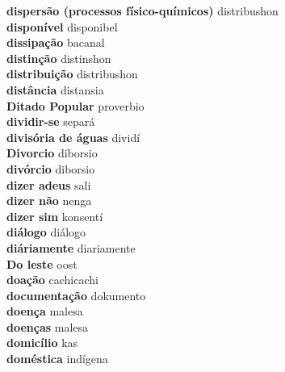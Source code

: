 \textbf{ dispersão (processos físico-químicos)  } distribushon \\
\textbf{ disponível  } disponibel \\
\textbf{ dissipação  } bacanal \\
\textbf{ distinção  } distinshon \\
\textbf{ distribuição  } distribushon \\
\textbf{ distância  } distansia \\
\textbf{ Ditado Popular  } proverbio \\
\textbf{ dividir-se  } separá \\
\textbf{ divisória de águas  } dividí \\
\textbf{ Divorcio  } diborsio \\
\textbf{ divórcio  } diborsio \\
\textbf{ dizer adeus  } sali \\
\textbf{ dizer não  } nenga \\
\textbf{ dizer sim  } konsentí \\
\textbf{ diálogo  } diálogo \\
\textbf{ diáriamente  } diariamente \\
\textbf{ Do leste  } oost \\
\textbf{ doação  } cachicachi \\
\textbf{ documentação  } dokumento \\
\textbf{ doença  } malesa \\
\textbf{ doenças  } malesa \\
\textbf{ domicílio  } kas \\
\textbf{ doméstica  } indígena \\
